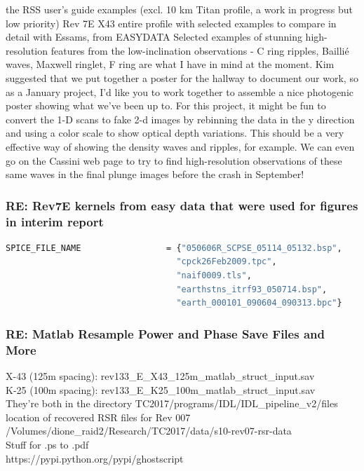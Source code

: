 \documentclass[crop=false,class=book]{standalone}
\begin{document}
the RSS user's guide examples (excl. 10 km Titan profile, a work in progress but low priority)
Rev 7E X43 entire profile with selected examples to compare in detail with Essams, from EASYDATA
Selected examples of stunning high-resolution features from the low-inclination observations - C ring ripples, Baillié waves, Maxwell ringlet, F ring are what I have in mind at the moment.
Kim suggested that we put together a poster for the hallway to document our work, so as a January project, I'd like you to work together to assemble a nice photogenic poster showing what we've been up to. For this project, it might be fun to convert the 1-D scans to fake 2-d images by rebinning the data in the y direction and using a color scale to show optical depth variations. This should be a very effective way of showing the density waves and ripples, for example. We can even go on the Cassini web page to try to find high-resolution observations of these same waves in the final plunge images before the crash in September!
\subsubsection{\footnotesize RE: Rev7E kernels from easy data that were used for figures in interim report}
\begin{lstlisting}[language=bash,basicstyle=\footnotesize]
SPICE_FILE_NAME                 = {"050606R_SCPSE_05114_05132.bsp",
                                  "cpck26Feb2009.tpc",
                                  "naif0009.tls",
                                  "earthstns_itrf93_050714.bsp",
                                  "earth_000101_090604_090313.bpc"}
\end{lstlisting}
\subsubsection{\footnotesize RE: Matlab Resample Power and Phase Save Files and More}
X-43 (125m spacing): rev133\_E\_X43\_125m\_matlab\_struct\_input.sav\\
K-25 (100m spacing): rev133\_E\_K25\_100m\_matlab\_struct\_input.sav\\
They’re both in the directory TC2017/programs/IDL/IDL\_pipeline\_v2/files\\
location of recovered RSR files for Rev 007\\
/Volumes/dione\_raid2/Research/TC2017/data/s10-rev07-rsr-data\\
Stuff for .ps to .pdf\\
https://pypi.python.org/pypi/ghostscript
\end{document}
